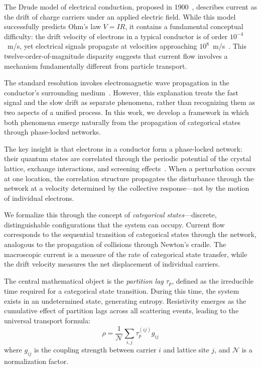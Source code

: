 \documentclass[twocolumn,showpacs,preprintnumbers,amsmath,amssymb,prd]{revtex4-2}
\newcommand{\taup}{\tau_p}
\begin{document}
The Drude model of electrical conduction, proposed in 1900~\cite{Drude1900}, describes current as the drift of charge carriers under an applied electric field. While this model successfully predicts Ohm's law $V = IR$, it contains a fundamental conceptual difficulty: the drift velocity of electrons in a typical conductor is of order $10^{-4}$~m/s, yet electrical signals propagate at velocities approaching $10^8$~m/s~\cite{Griffiths2017}. This twelve-order-of-magnitude disparity suggests that current flow involves a mechanism fundamentally different from particle transport.

The standard resolution invokes electromagnetic wave propagation in the conductor's surrounding medium~\cite{Jackson1999}. However, this explanation treats the fast signal and the slow drift as separate phenomena, rather than recognizing them as two aspects of a unified process. In this work, we develop a framework in which both phenomena emerge naturally from the propagation of categorical states through phase-locked networks.

The key insight is that electrons in a conductor form a phase-locked network: their quantum states are correlated through the periodic potential of the crystal lattice, exchange interactions, and screening effects~\cite{Ashcroft1976}. When a perturbation occurs at one location, the correlation structure propagates the disturbance through the network at a velocity determined by the collective response---not by the motion of individual electrons.

We formalize this through the concept of \emph{categorical states}---discrete, distinguishable configurations that the system can occupy. Current flow corresponds to the sequential transition of categorical states through the network, analogous to the propagation of collisions through Newton's cradle. The macroscopic current is a measure of the rate of categorical state transfer, while the drift velocity measures the net displacement of individual carriers.

The central mathematical object is the \emph{partition lag} $\taup$, defined as the irreducible time required for a categorical state transition. During this time, the system exists in an undetermined state, generating entropy. Resistivity emerges as the cumulative effect of partition lags across all scattering events, leading to the universal transport formula:
\begin{equation}
\rho = \frac{1}{\mathcal{N}} \sum_{i,j} \taup^{(ij)} g_{ij}
\label{eq:universal_resistivity_intro}
\end{equation}
where $g_{ij}$ is the coupling strength between carrier $i$ and lattice site $j$, and $\mathcal{N}$ is a normalization factor.
\end{document}
